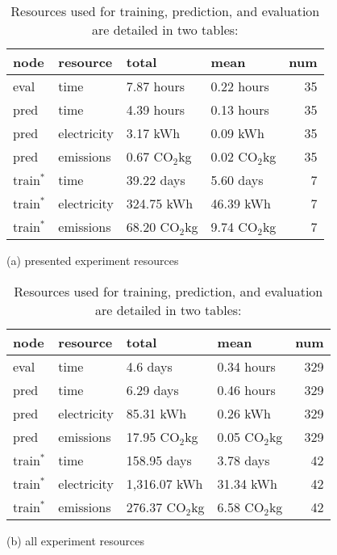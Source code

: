 \documentclass[10pt,twocolumn,letterpaper]{article}
\newcommand{\cotwo}{\ensuremath{\mathrm{CO_2}}}
\begin{document}
\begin{table}[t]
    \centering
\begin{tabular}{llllr}
\toprule
        node & resource &           total &            mean &  num \\
\midrule
eval        & time         & 7.87 hours     &  0.22 hours     &   35 \\
\midrule
pred        & time         & 4.39 hours     &  0.13 hours     &   35 \\
pred        & electricity  & 3.17 kWh       &  0.09 kWh       &   35 \\
pred        & emissions    & 0.67 \cotwo kg &  0.02 \cotwo kg &   35 \\
\midrule
train$^{*}$ & time         & 39.22 days      & 5.60 days      &   7 \\
train$^{*}$ & electricity  & 324.75 kWh      & 46.39 kWh      &   7 \\
train$^{*}$ & emissions    & 68.20 \cotwo kg & 9.74 \cotwo kg &   7 \\
\bottomrule
\end{tabular}
(a) presented experiment resources
\begin{tabular}{llllr}
\toprule
        node & resource &           total &            mean &  num \\
\midrule
eval        & time        & 4.6 days        & 0.34 hours     &  329 \\
\midrule
pred        & time        & 6.29 days       & 0.46 hours     &  329 \\
pred        & electricity & 85.31 kWh       & 0.26 kWh       &  329 \\
pred        & emissions   & 17.95 \cotwo kg & 0.05 \cotwo kg &  329 \\
\midrule
train$^{*}$ & time        & 158.95 days      &     3.78 days  &   42 \\
train$^{*}$ & electricity & 1,316.07 kWh      &     31.34 kWh  &   42 \\
train$^{*}$ & emissions   & 276.37 \cotwo kg & 6.58 \cotwo kg &   42 \\
\bottomrule
\end{tabular}
(b) all experiment resources
\caption[]{
Resources used for training, prediction, and evaluation are detailed in two tables:
}
\end{table}
\end{document}
